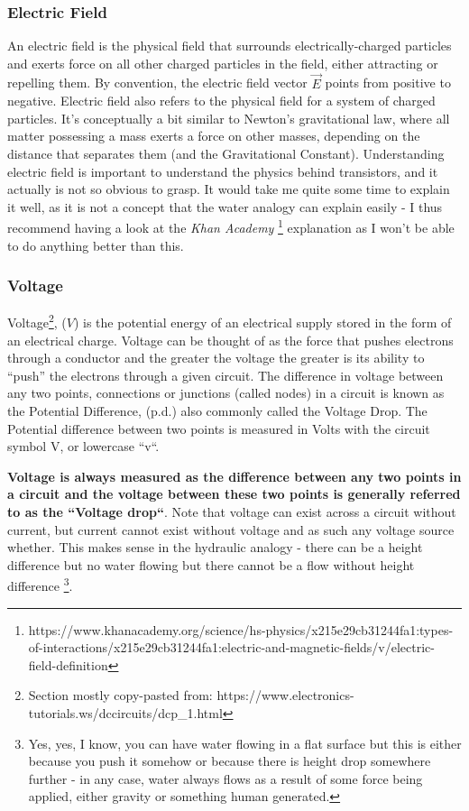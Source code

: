 \subsubsection{Electric Field}

An electric field is the physical field that surrounds electrically-charged particles and exerts force on all other charged particles in the field, either attracting or repelling them. By convention, the electric field vector $\vec{E}$ points from positive to negative. Electric field also refers to the physical field for a system of charged particles. It's conceptually a bit similar to Newton's gravitational law, where all matter possessing a mass exerts a force on other masses, depending on the distance that separates them (and the Gravitational Constant). Understanding electric field is important to understand the physics behind transistors, and it actually is not so obvious to grasp. It would take me quite some time to explain it well, as it is not a concept that the water analogy can explain easily - I thus recommend having a look at the \textit{Khan Academy} \footnote{https://www.khanacademy.org/science/hs-physics/x215e29cb31244fa1:types-of-interactions/x215e29cb31244fa1:electric-and-magnetic-fields/v/electric-field-definition} explanation as I won't be able to do anything better than this. 

\subsubsection{Voltage}

Voltage\footnote{Section mostly copy-pasted from: https://www.electronics-tutorials.ws/dccircuits/dcp\_1.html}, ($V$) is the potential energy of an electrical supply stored in the form of an electrical charge. Voltage can be thought of as the force that pushes electrons through a conductor and the greater the voltage the greater is its ability to “push” the electrons through a given circuit. The difference in voltage between any two points, connections or junctions (called nodes) in a circuit is known as the Potential Difference, (p.d.) also commonly called the Voltage Drop. The Potential difference between two points is measured in Volts with the circuit symbol V, or lowercase “v“.

\textbf{Voltage is always measured as the difference between any two points in a circuit and the voltage between these two points is generally referred to as the “Voltage drop“}. Note that voltage can exist across a circuit without current, but current cannot exist without voltage and as such any voltage source whether. This makes sense in the hydraulic analogy - there can be a height difference but no water flowing but there cannot be a flow without height difference \footnote{Yes, yes, I know, you can have water flowing in a flat surface but this is either because you push it somehow or because there is height drop somewhere further - in any case, water always flows as a result of some force being applied, either gravity or something human generated.}. 

